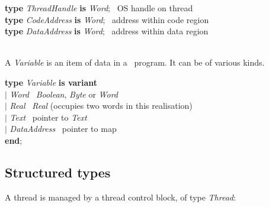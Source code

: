 \begin{tabbing}
\indents
\vb\>\textbf{type} \emph{ThreadHandle} \textbf{is} \emph{Word};
   \>\>\>\>\>\>\>\>\> \rmk\ OS handle on thread\\
\vb\>\textbf{type} \emph{CodeAddress} \textbf{is} \emph{Word};
   \>\>\>\>\>\>\>\>\> \rmk\ address within code region\\
\vb\>\textbf{type} \emph{DataAddress} \textbf{is} \emph{Word};
   \>\>\>\>\>\>\>\>\> \rmk\ address within data region\\
\\[-30pt]
\end{tabbing}

A \emph{Variable} is an item of data in a \desi\ program. It can be of various kinds.

\begin{tabbing}
\indents
\vb\>\textbf{type} \emph{Variable} \textbf{is variant}\\
\vb\>$|$ \emph{Word}         \>\>\>\>\>\>\> \rmk\ \emph{Boolean}, \emph{Byte} or \emph{Word} \\
\vb\>$|$ \emph{Real}         \>\>\>\>\>\>\> \rmk\ \emph{Real} (occupies two words in this realisation)\\
\vb\>$|$ \emph{Text}         \>\>\>\>\>\>\> \rmk\ pointer to \emph{Text}\\
\vb\>$|$ \emph{DataAddress}  \>\>\>\>\>\>\> \rmk\ pointer to map\\
\vb\>\textbf{end};
\end{tabbing}



\subsection{Structured types}\label{structuredtypes}

A thread is managed by a thread control block, of type \emph{Thread}:

